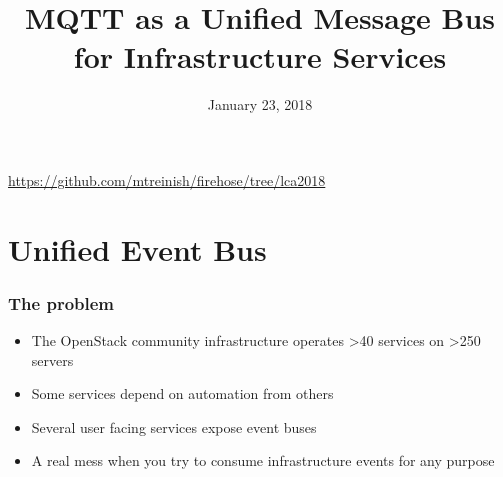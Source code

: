 \documentclass[aspectratio=169,11pt,hyperref={colorlinks=true}]{beamer}
\author[Matthew Treinish & Jeremy Stanley]{%
    \texorpdfstring{%
        \begin{columns}
            \column{.45\linewidth}
            \centering
            Matthew Treinish\\
            Open Source Developer Advocate - IBM\\
            \href{mailto:mtreinish@kortar.org}{mtreinish@kortar.org}\\
        \texttt{mtreinish on Freenode}
        \column{.45\linewidth}
            \centering
            Jeremy Stanley\\
            \href{mailto:fungi@yuggoth.org}{fungi@yuggoth.org}\\
            \texttt{fungi on Freenode}
        \end{columns}
        }
    {Matthew Treinish & Jeremy Stanley}
}
\date{January 23, 2018}
\title[MQTT as a Unified Message Bus for Infrastructure Services
\hspace{2em}\insertframenumber/\inserttotalframenumber]{MQTT as a Unified Message Bus for Infrastructure Services}
\begin{document}
{%
\begin{frame}[noframenumbering]
    \hypersetup{colorlinks,urlcolor=white}
    \titlepage{}
    \centering
    \href{https://github.com/mtreinish/firehose/tree/lca2018}{https://github.com/mtreinish/firehose/tree/lca2018}
\end{frame}
}

\section{Unified Event Bus}

\begin{frame}
    \frametitle{The problem}
    \begin{itemize}
        \item The OpenStack community infrastructure operates >40 services on >250 servers
        \item Some services depend on automation from others
        \item Several user facing services expose event buses
        \item A real mess when you try to consume infrastructure events for any purpose
    \end{itemize}
\end{frame}
\end{document}
